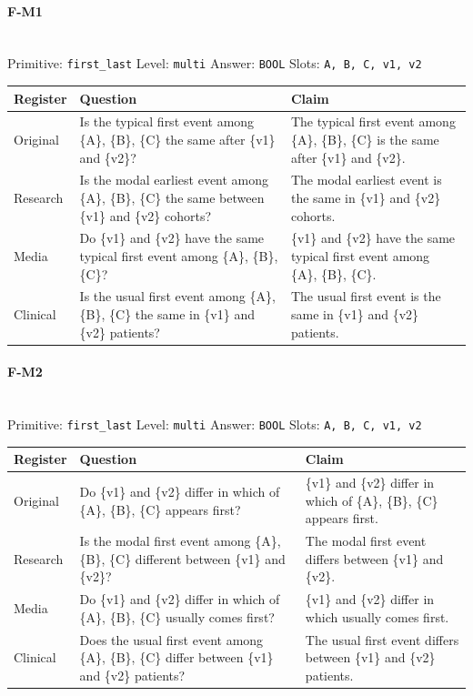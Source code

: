 \documentclass[11pt]{article}
\begin{document}
\paragraph{\textbf{F-M1}}\mbox{}\\
Primitive: \texttt{first\_last} \quad Level: \texttt{multi} \quad Answer: \texttt{BOOL} \quad Slots: \texttt{A, B, C, v1, v2}\\[2pt]
\begin{tabularx}{\linewidth}{@{}l L L@{}}
\toprule
\textbf{Register} & \textbf{Question} & \textbf{Claim} \\
\midrule
Original & Is the typical first event among \{A\}, \{B\}, \{C\} the same after \{v1\} and \{v2\}? & The typical first event among \{A\}, \{B\}, \{C\} is the same after \{v1\} and \{v2\}. \\
Research & Is the modal earliest event among \{A\}, \{B\}, \{C\} the same between \{v1\} and \{v2\} cohorts? & The modal earliest event is the same in \{v1\} and \{v2\} cohorts. \\
Media & Do \{v1\} and \{v2\} have the same typical first event among \{A\}, \{B\}, \{C\}? & \{v1\} and \{v2\} have the same typical first event among \{A\}, \{B\}, \{C\}. \\
Clinical & Is the usual first event among \{A\}, \{B\}, \{C\} the same in \{v1\} and \{v2\} patients? & The usual first event is the same in \{v1\} and \{v2\} patients. \\
\bottomrule
\end{tabularx}
\vspace{4pt}

\paragraph{\textbf{F-M2}}\mbox{}\\
Primitive: \texttt{first\_last} \quad Level: \texttt{multi} \quad Answer: \texttt{BOOL} \quad Slots: \texttt{A, B, C, v1, v2}\\[2pt]
\begin{tabularx}{\linewidth}{@{}l L L@{}}
\toprule
\textbf{Register} & \textbf{Question} & \textbf{Claim} \\
\midrule
Original & Do \{v1\} and \{v2\} differ in which of \{A\}, \{B\}, \{C\} appears first? & \{v1\} and \{v2\} differ in which of \{A\}, \{B\}, \{C\} appears first. \\
Research & Is the modal first event among \{A\}, \{B\}, \{C\} different between \{v1\} and \{v2\}? & The modal first event differs between \{v1\} and \{v2\}. \\
Media & Do \{v1\} and \{v2\} differ in which of \{A\}, \{B\}, \{C\} usually comes first? & \{v1\} and \{v2\} differ in which usually comes first. \\
Clinical & Does the usual first event among \{A\}, \{B\}, \{C\} differ between \{v1\} and \{v2\} patients? & The usual first event differs between \{v1\} and \{v2\} patients. \\
\bottomrule
\end{tabularx}
\vspace{4pt}
\end{document}
